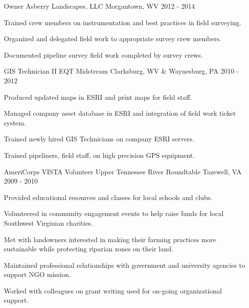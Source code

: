 \begin{cventries}

\cventry
{Owner} %
{Asberry Landscapes, LLC} %
{Morgantown, WV} %
{2012 - 2014} %
{ %
\begin{cvitems}
\item {Trained crew members on instrumentation and best practices in field surveying.}
\item {Organized and delegated field work to appropriate survey crew members.}
\item {Documented pipeline survey field work completed by survey crews.}
\end{cvitems} 
}


\cventry
{GIS Technician II} %
{EQT Midstream} %
{Clarksburg, WV \& Waynesburg, PA} %
{2010 - 2012} %
{ %
\begin{cvitems}
\item {Produced updated maps in ESRI and print maps for field staff.}
\item {Managed company asset database in ESRI and integration of field work ticket system.}
\item {Trained newly hired GIS Technicians on company ESRI servers.}
\item {Trained pipeliners, field staff, on high precision GPS equipment.}
\end{cvitems}
}


\cventry
{AmeriCorps VISTA Volunteer} %
{Upper Tennessee River Roundtable} %
{Tazewell, VA} %
{2009 - 2010} %
{ %
\begin{cvitems}
\item {Provided educational resources and classes for local schools and clubs.}
\item {Volunteered in community engagement events to help raise funds for local Southwest Virginian charities.}
\item {Met with landowners interested in making their farming practices more sustainable while protecting riparian zones on their land.}
\item {Maintained professional relationships with government and university agencies to support NGO mission.}
\item {Worked with colleagues on grant writing used for on-going organizational support.}
\end{cvitems}
}


\end{cventries}
